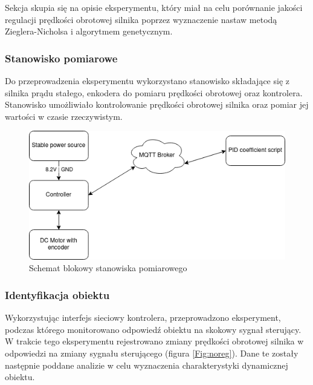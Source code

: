 \documentclass[12pt,twoside]{article}
\begin{document}
Sekcja skupia się na opisie eksperymentu, który miał na celu porównanie jakości regulacji prędkości obrotowej silnika poprzez wyznaczenie nastaw metodą Zieglera-Nicholsa \cite{ZIEGLER} i algorytmem genetycznym.

\subsubsection{Stanowisko pomiarowe}

Do przeprowadzenia eksperymentu wykorzystano stanowisko składające się z silnika prądu stałego, enkodera do pomiaru prędkości obrotowej oraz kontrolera. Stanowisko umożliwiało kontrolowanie prędkości obrotowej silnika oraz pomiar jej wartości w czasie rzeczywistym.

\begin{figure}[ht]%
 \centering%
 \includegraphics[width=12cm]{figures/PID/pidEXP.png}%
 \caption{Schemat blokowy stanowiska pomiarowego}%
 \label{Fig:blockPID}%
\end{figure}

\subsubsection{Identyfikacja obiektu}

Wykorzystując interfejs sieciowy kontrolera, przeprowadzono eksperyment, podczas którego monitorowano odpowiedź obiektu na skokowy sygnał sterujący. W trakcie tego eksperymentu rejestrowano zmiany prędkości obrotowej silnika w odpowiedzi na zmiany sygnału sterującego (figura \ref{Fig:noreg}). Dane te zostały następnie poddane analizie w celu wyznaczenia charakterystyki dynamicznej obiektu.
\end{document}

